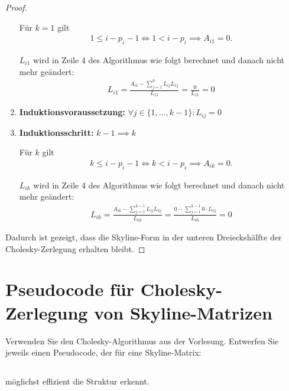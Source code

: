 \documentclass[titlepage]{article}
\begin{document}
\begin{proof}
\begin{enumerate}
		Für $k=1$ gilt
		\begin{align*}
			1 \leq i - p_i - 1 \iff 1 < i - p_i \implies A_{i1} = 0.
		\end{align*}
		
		$L_{i1}$ wird in Zeile 4 des Algorithmus wie folgt berechnet und danach nicht mehr geändert:
		\begin{align*}
			L_{i1} = \frac{A_{i1} - \sum_{j=1}^{0}L_{ij}L_{1j}}{L_{11}} = \frac{0}{L_{11}} = 0
		\end{align*}
	
		\item \textbf{Induktionsvoraussetzung:} $\forall j \in \{1, ..., k - 1\}: L_{ij} = 0$
		
		\item \textbf{Induktionsschritt:} $k-1 \implies k$
		
		Für $k$ gilt
		\begin{align*}
			k \leq i - p_i - 1 \iff k < i - p_i \implies A_{ik} = 0.
		\end{align*}
		
		$L_{ik}$ wird in Zeile 4 des Algorithmus wie folgt berechnet und danach nicht mehr geändert:
		\begin{align*}
			L_{ik} = \frac{A_{ik} - \sum_{j=1}^{k-1}L_{ij}L_{kj}}{L_{kk}} = \frac{0 - \sum_{j=1}^{k - 1}0\cdot L_{kj}}{L_{kk}} = 0
		\end{align*}
	\end{enumerate}
	
	Dadurch ist gezeigt, dass die Skyline-Form in der unteren Dreieckshälfte der Cholesky-Zerlegung erhalten bleibt.
\end{proof}
\newpage



\section{Pseudocode für Cholesky-Zerlegung von Skyline-Matrizen}
Verwenden Sie den Cholesky-Algorithmus aus der Vorlesung. Entwerfen Sie jeweils einen Pseudocode, der für eine Skyline-Matrix:


\subsection{}
möglichst effizient die Struktur erkennt.
\end{document}
